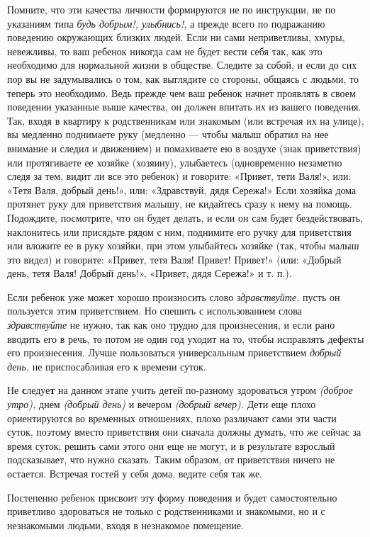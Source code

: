 \documentclass{book}
\renewcommand{\emph}[1]{\textit{#1}}
\begin{document}
Помните, что эти качества личности формируются не по инструкции, не по
указаниям типа \emph{будь добрым!, улыбнись!,} а прежде всего по
подражанию поведению окружающих близких людей. Если ни сами
неприветливы, хмуры, невежливы, то ваш ребенок никогда сам не будет
вести себя так, как это необходимо для нормальной жизни в обществе.
Следите за собой, и если до сих пор вы не задумывались о том, как
выглядите со стороны, общаясь с людьми, то теперь это необходимо. Ведь
прежде чем ваш ребенок начнет проявлять в своем поведении указанные выше
качества, он должен впитать их из вашего поведения. Так, входя в
квартиру к родственникам или знакомым (или встречая их на улице), вы
медленно поднимаете руку (медленно --- чтобы малыш обратил на нее
внимание и следил и движением) и помахиваете ею в воздухе (знак
приветствия) или протягиваете ее хозяйке (хозяину), улыбаетесь
(одновременно незаметно следя за тем, видит ли все это ребенок) и
говорите: «Привет, тети Валя!», или: «Тетя Валя, добрый день!», или:
«Здравствуй, дядя Сережа!» Если хозяйка дома протянет руку для
приветствия малышу, не кидайтесь сразу к нему на помощь. Подождите,
посмотрите, что он будет делать, и если он сам будет бездействовать,
наклонитесь или присядьте рядом с ним, поднимите его ручку для
приветствия или вложите ее в руку хозяйки, при этом улыбайтесь хозяйке
(так, чтобы малыш это видел) и говорите: «Привет, тетя Валя! Привет!
Привет!» (или: «Добрый день, тетя Валя! Добрый день!», «Привет, дядя
Сережа!» и т. п.).

Если ребенок уже может хорошо произносить слово \emph{здравствуйте,}
пусть он пользуется этим приветствием. Но спешить с использованием слова
\emph{здравствуйте} не нужно, так как оно трудно для произнесения, и
если рано вводить его в речь, то потом не один год уходит на то, чтобы
исправлять дефекты его произнесения. Лучше пользоваться универсальным
приветствием \emph{добрый день,} не приспосабливая его к времени суток.

Не \textbf{с}ледуе\textbf{т} на данном этапе учить детей по-разному
здороваться утром \emph{(доброе утро),} днем \emph{(добрый день)} и
вечером \emph{(добрый вечер).} Дети еще плохо ориентируются во временных
отношениях, плохо различают сами эти части суток, поэтому вместо
приветствия они сначала должны думать, что же сейчас за время суток;
решить сами этого они еще не могут, и в результате взрослый
подсказывает, что нужно сказать. Таким образом, от приветствия ничего не
остается. Встречая гостей у себя дома, ведите себя так же.

Постепенно ребенок присвоит эту форму поведения и будет самостоятельно
приветливо здороваться не только с родственниками и знакомыми, но и с
незнакомыми людьми, входя в незнакомое помещение.
\end{document}
